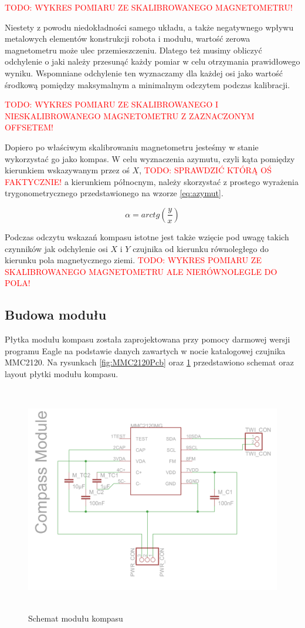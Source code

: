 \textcolor{red}{TODO: WYKRES POMIARU ZE SKALIBROWANEGO MAGNETOMETRU!}

Niestety z powodu niedokładności samego układu, a także negatywnego wpływu metalowych elementów konstrukcji robota i modułu, wartość zerowa magnetometru może ulec przemieszczeniu. Dlatego też musimy obliczyć odchylenie o jaki należy przesunąć każdy pomiar w celu otrzymania prawidłowego wyniku. Wspomniane odchylenie ten wyznaczamy dla każdej osi jako wartość środkową pomiędzy maksymalnym a minimalnym odczytem podczas kalibracji.

\textcolor{red}{TODO: WYKRES POMIARU ZE SKALIBROWANEGO I NIESKALIBROWANEGO MAGNETOMETRU Z ZAZNACZONYM OFFSETEM!}

Dopiero po właściwym skalibrowaniu magnetometru jesteśmy w stanie wykorzystać go jako kompas. W celu wyznaczenia azymutu, czyli kąta pomiędzy kierunkiem wskazywanym przez oś $X$, \textcolor{red}{TODO: SPRAWDZIĆ KTÓRĄ OŚ FAKTYCZNIE!} a kierunkiem północnym, należy skorzystać z prostego wyrażenia trygonometrycznego przedstawionego na wzorze \ref{eq:azymut}.

\begin{equation}
  \label{eq:azymut}
  \alpha = arctg \left( \frac{y}{x} \right)
\end{equation}

Podczas odczytu wskazań kompasu istotne jest także wzięcie pod uwagę takich czynników jak odchylenie osi $X$ i $Y$ czujnika od kierunku równoległego do kierunku pola magnetycznego ziemi.
\textcolor{red}{TODO: WYKRES POMIARU ZE SKALIBROWANEGO MAGNETOMETRU ALE NIERÓWNOLEGLE DO POLA!}

\subsection{Budowa modułu}
Płytka modułu kompasu została zaprojektowana przy pomocy darmowej wersji programu Eagle na podstawie danych zawartych w nocie katalogowej czujnika MMC2120. Na rysunkach \ref{fig:MMC2120Pcb} oraz \ref{fig:MMC2120Sch} przedstawiono schemat oraz layout płytki modułu kompasu.

\begin{figure}[!ht]
 \centering
 \includegraphics[height=100mm]{../images/ch04/mmc2120mgsch.png}
 \caption{Schemat modułu kompasu}
 \label{fig:MMC2120Sch}
\end{figure}

